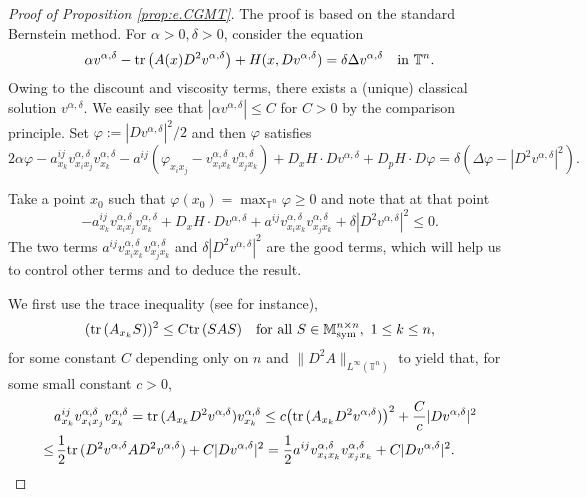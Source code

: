 \documentclass[12pt,reqno]{amsart}
\theoremstyle{plain}
\theoremstyle{remark}
\numberwithin{equation}{section}
\begin{document}
\begin{proof}[Proof of Proposition {\rm\ref{prop:e.CGMT}}]
The proof is based on the standard Bernstein method. 
For ${\alpha}>0,{\delta}>0$, consider the equation
\[
{\alpha} v^{{\alpha},{\delta}}-{{\rm tr}\,}\big(A(x)D^2v^{{\alpha},{\delta}}\big)+H(x,Dv^{{\alpha},{\delta}})={\delta}{\Delta} v^{{\alpha},{\delta}} \quad \text{in} \ {\mathbb{T}}^n. 
\]
Owing to the discount and viscosity terms, there exists a (unique) classical solution $v^{{\alpha},{\delta}}$. 
We easily see that $|{\alpha} v^{{\alpha},{\delta}}|\le C$ for $C>0$ by the comparison principle. 
Set $\varphi:=|Dv^{{\alpha},{\delta}}|^2/2$ and then $\varphi$ satisfies 
\[
2{\alpha}\varphi-a^{ij}_{x_k}v^{{\alpha},{\delta}}_{x_ix_j}v^{{\alpha},{\delta}}_{x_k}
-a^{ij}(\varphi_{x_ix_j}-v^{{\alpha},{\delta}}_{x_ix_k}v^{{\alpha},{\delta}}_{x_jx_k})
+D_{x}H\cdot Dv^{{\alpha},{\delta}}+D_{p}H\cdot D\varphi={\delta}({\Delta}\varphi-|D^2v^{{\alpha},{\delta}}|^2). 
\]

Take a point $x_0$ such that $\varphi(x_0)=\max_{{\mathbb{T}}^n}\varphi\geq 0$ and note that
at that point
\begin{equation}\label{Bern-0}
-a^{ij}_{x_k}v^{{\alpha},{\delta}}_{x_ix_j}v^{{\alpha},{\delta}}_{x_k}
+D_{x}H\cdot Dv^{{\alpha},{\delta}}+a^{ij}v^{{\alpha},{\delta}}_{x_i x_k}v^{{\alpha},{\delta}}_{x_j x_k}+{\delta}|D^2v^{{\alpha},{\delta}}|^2 \leq 0.
\end{equation}
The two terms $a^{ij}v^{{\alpha},{\delta}}_{x_i x_k}v^{{\alpha},{\delta}}_{x_j x_k}$ and ${\delta} |D^2 v^{{\alpha},{\delta}}|^2$ are the good terms, which will help us to control other terms and to deduce the result.

We first use the trace inequality (see \cite[Lemma 3.2.3]{SV} for instance),
\begin{equation}\label{SV-a2}
({{\rm tr}\,}(A_{x_k} S))^2 \leq C {{\rm tr}\,}(SAS) \quad  
\text{for all} \ S \in {\mathbb{M}}^{n\times n}_{\text{sym}}, \ 1 \leq k \leq n, 
\end{equation}
for some constant $C$ depending only on $n$ and $\|D^2 A\|_{L^\infty({\mathbb{T}}^n)}$
to yield that, for some small constant $c>0$,
\begin{align}
&a^{ij}_{x_k}v^{{\alpha},{\delta}}_{x_ix_j}v^{{\alpha},{\delta}}_{x_k}
={{\rm tr}\,}(A_{x_k} D^2v^{{\alpha},{\delta}})v^{{\alpha},{\delta}}_{x_k}
\le c \big({{\rm tr}\,}(A_{x_k} D^2v^{{\alpha},{\delta}})\big)^{2}+ \frac{C}{c}|Dv^{{\alpha},{\delta}}|^2\notag\\
\leq&\, 
\frac{1}{2}{{\rm tr}\,}(D^2v^{{\alpha},{\delta}}A D^2v^{{\alpha},{\delta}})+ C|Dv^{{\alpha},{\delta}}|^2
=\frac{1}{2}a^{ij}v^{{\alpha},{\delta}}_{x_i x_k}v^{{\alpha},{\delta}}_{x_j x_k}+C|Dv^{{\alpha},{\delta}}|^2.\label{Bern-1}
\end{align}


\end{proof}
\end{document}
